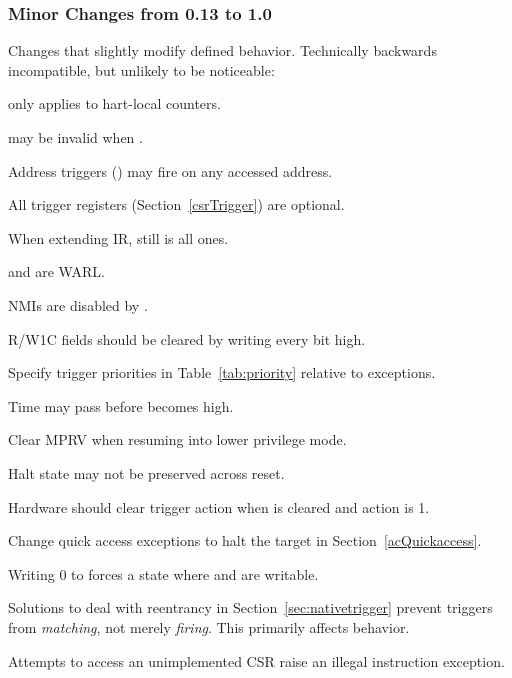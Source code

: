 \subsubsection{Minor Changes from 0.13 to 1.0}

\begin{steps}{Changes that slightly modify defined behavior. Technically backwards
incompatible, but unlikely to be noticeable:}
    \item \FcsrDcsrStopcount only applies to hart-local counters. 
    \item \FdmDmstatusVersion may be invalid when . 
    \item Address triggers (\RcsrMcontrol) may fire on any accessed address. 
    \item All trigger registers (Section~\ref{csrTrigger}) are optional. 
    \item When extending IR, \RdtmBypass still is all ones. 
    \item \FcsrDcsrEbreaks and \FcsrDcsrEbreaku are WARL. 
    \item NMIs are disabled by \FcsrDcsrStepie. 
    \item R/W1C fields should be cleared by writing every bit high. 
    \item Specify trigger priorities in Table~\ref{tab:priority} relative to exceptions. 
    \item Time may pass before \FdmDmcontrolDmactive becomes high. 
    \item Clear MPRV when resuming into lower privilege mode. 
    \item Halt state may not be preserved across reset. 
    \item Hardware should clear trigger action when \FcsrTdataOneDmode is
        cleared and action is 1. 
    \item Change quick access exceptions to halt the target in
    Section~\ref{acQuickaccess}. 
    \item Writing 0 to \RcsrTdataOne forces a state where \RcsrTdataTwo and
        \RcsrTdataThree are writable. 
    \item Solutions to deal with reentrancy in Section~\ref{sec:nativetrigger}
        prevent triggers from {\em matching}, not merely {\em firing}. This primarily
        affects \RcsrIcount behavior. 
    \item Attempts to access an unimplemented CSR raise an illegal instruction
        exception. 
\end{steps}

